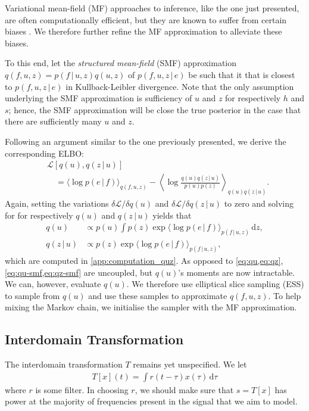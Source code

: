 \documentclass{article}
\newcommand{\id}[1]{\, \mathrm{d} #1}     %
\newcommand{\cond}{\, | \,}               %
\renewcommand{\ll}{\left}
\newcommand{\rr}{\right}
\newcommand{\la}{\langle}
\newcommand{\ra}{\rangle}
\begin{document}
Variational mean-field (MF) approaches to inference, like the one just presented, are often computationally efficient, but they are known to suffer from certain biases \cite{MacKay:2002:Information_Theory_Learning,Turner:2011:Two_Problems_With_Variational_Expectation,Murphy:2012:Probabilistic_Perspective}. We therefore further refine the MF approximation to alleviate these biases.

To this end, let the \textit{structured mean-field} (SMF) approximation $q(f,u,z)=p(f\cond u, z)q(u,z)$ of $p(f,u,z\cond e)$ be such that it that is closest to $p(f,u,z\cond e)$ in Kullback-Leibler divergence. Note that the only assumption underlying the SMF approximation is sufficiency of $u$ and $z$ for respectively $h$ and $s$; hence, the SMF approximation will be close the true posterior in the case that there are sufficiently many $u$ and $z$.

Following an argument similar to the one previously presented, we derive the corresponding ELBO:
\begin{align*}
    &\mathcal{L}[q(u),q(z\cond u)] \\
    &\quad= \la \log p(e\cond f) \ra_{q(f,u,z)}- \ll\la\log\frac{q(u)q(z\cond u)}{p(u)p(z)}\rr\ra_{q(u)q(z\cond u)}.
\end{align*}
Again, setting the variations $\delta \mathcal{L} / \delta q(u)$ and $\delta \mathcal{L} / \delta q(z\cond u)$ to zero and solving for for respectively $q(u)$ and $q(z\cond u)$ yields that
\begin{align}
    q(u) &\propto p(u) \int p(z) \exp\la\log p(e\cond f)\ra_{p(f\cond u, z)}\id{z}, \label{eq:qu-smf} \\
    q(z\cond u) &\propto p(z)\exp\la \log p(e\cond f)\ra_{p(f\cond u, z)}, \label{eq:qz-smf}
\end{align}
which are computed in \cref{app:computation_quz}.
As opposed to \cref{eq:qu,eq:qz}, \cref{eq:qu-smf,eq:qz-smf} are uncoupled, but $q(u)$'s moments are now intractable. We can, however, evaluate $q(u)$. We therefore use elliptical slice sampling (ESS) \cite{Murray:2010:Elliptical_Slice_Sampling} to sample from $q(u)$ and use these samples to approximate $q(f, u, z)$. To help mixing the Markov chain, we initialise the sampler with the MF approximation.

\subsection{Interdomain Transformation}
The interdomain transformation $T$ remains yet unspecified. We let
\begin{align*}
    T[x](t)=\int r(t- \tau)x(\tau) \id{\tau}
\end{align*}
where $r$ is some filter. In choosing $r$, we should make sure that $s=T[x]$ has power at the majority of frequencies present in the signal that we aim to model.
\end{document}
